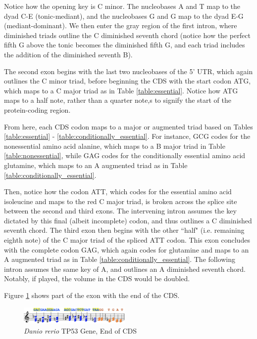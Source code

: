 \documentclass[letterpaper]{article}
\begin{document}
Notice how the opening key is C minor. The nucleobases A and T map to the dyad C-E\musFlat \; (tonic-mediant), and the nucleobases G and G map to the dyad E\musFlat-G (mediant-dominant). We then enter the gray region of the first intron, where diminished triads outline the C diminished seventh chord (notice how the perfect fifth G above the tonic becomes the diminished fifth G\musFlat, and each triad includes the addition of the diminished seventh B\musDoubleFlat). 

The second exon begins with the last two nucleobases of the 5' UTR, which again outlines the C minor triad, before beginning the CDS with the start codon ATG, which maps to a C major triad as in Table \ref{table:essential}. Notice how ATG maps to a half note, rather than a quarter note,s to signify the start of the protein-coding region.

From here, each CDS codon maps to a major or augmented triad based on Tables \ref{table:essential} - \ref{table:conditionally_essential}. For instance, GCG codes for the nonessential amino acid alanine, which maps to a B major triad in Table \ref{table:nonessential}, while GAG codes for the conditionally essential amino acid glutamine, which maps to an A augmented triad as in Table \ref{table:conditionally_essential}. 

Then, notice how the codon ATT, which codes for the essential amino acid isoleucine and maps to the red C\musSharp\; major triad, is broken across the splice site between the second and third exons. The intervening intron assumes the key dictated by this final (albeit incomplete) codon, and thus outlines a C\musSharp \; diminished seventh chord. The third exon then begins with the other ``half" (i.e.  remaining eighth note) of the C\musSharp\; major triad of the spliced ATT codon. This exon concludes with the complete codon GAG, which again codes for glutamine and maps to an A augmented triad as in Table \ref{table:conditionally_essential}. The following intron assumes the same key of A, and outlines an A \; diminished seventh chord. Notably, if played, the volume in the CDS would be doubled.

Figure \ref{fig:danio_rerio_end_translation} shows part of the exon with the end of the CDS. 

\begin{figure}[h!]
\centering
\vspace{-3mm}
\includegraphics[width=0.48\textwidth]{images/danio_rerio_end_translation}
  \caption{\textit{Danio rerio} TP53 Gene, End of CDS}
  \label{fig:danio_rerio_end_translation}
  \vspace{-4mm}
\end{figure}
\end{document}
